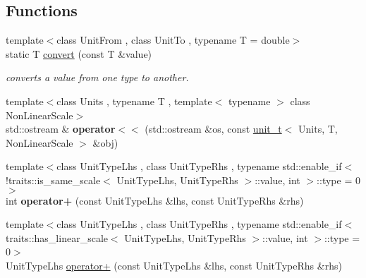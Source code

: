 \subsection*{Functions}
\begin{DoxyCompactItemize}
\item 
{\footnotesize template$<$class Unit\+From , class Unit\+To , typename T  = double$>$ }\\static T \hyperlink{group___conversion_gae7541dbcd66420e011c82ac58ef7723c}{convert} (const T \&value)
\begin{DoxyCompactList}\small\item\em converts a {\itshape value} from one type to another. \end{DoxyCompactList}\item 
\hypertarget{namespaceunits_a86c838bed1ec47df6357e611aca1ca6a}{}{\footnotesize template$<$class Units , typename T , template$<$ typename $>$ class Non\+Linear\+Scale$>$ }\\std\+::ostream \& {\bfseries operator$<$$<$} (std\+::ostream \&os, const \hyperlink{classunits_1_1unit__t}{unit\+\_\+t}$<$ Units, T, Non\+Linear\+Scale $>$ \&obj)\label{namespaceunits_a86c838bed1ec47df6357e611aca1ca6a}

\item 
\hypertarget{namespaceunits_a4d28d681e2cb80d41ee4b4ca0e851f9c}{}{\footnotesize template$<$class Unit\+Type\+Lhs , class Unit\+Type\+Rhs , typename std\+::enable\+\_\+if$<$!traits\+::is\+\_\+same\+\_\+scale$<$ Unit\+Type\+Lhs, Unit\+Type\+Rhs $>$\+::value, int $>$\+::type  = 0$>$ }\\int {\bfseries operator+} (const Unit\+Type\+Lhs \&lhs, const Unit\+Type\+Rhs \&rhs)\label{namespaceunits_a4d28d681e2cb80d41ee4b4ca0e851f9c}

\item 
\hypertarget{namespaceunits_a67b2fe0b52dd4cbcee76610289d76ae0}{}{\footnotesize template$<$class Unit\+Type\+Lhs , class Unit\+Type\+Rhs , typename std\+::enable\+\_\+if$<$ traits\+::has\+\_\+linear\+\_\+scale$<$ Unit\+Type\+Lhs, Unit\+Type\+Rhs $>$\+::value, int $>$\+::type  = 0$>$ }\\Unit\+Type\+Lhs \hyperlink{namespaceunits_a67b2fe0b52dd4cbcee76610289d76ae0}{operator+} (const Unit\+Type\+Lhs \&lhs, const Unit\+Type\+Rhs \&rhs)\label{namespaceunits_a67b2fe0b52dd4cbcee76610289d76ae0}


\end{DoxyCompactItemize}
